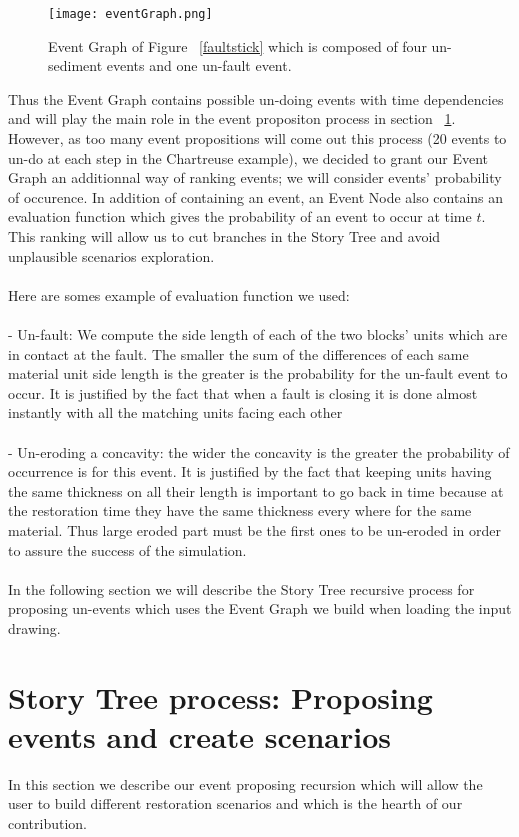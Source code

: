\documentclass[12pt, a4paper]{report} %
\begin{document}
	\begin{figure}[H]
	\centering
	\texttt{[image: eventGraph.png]}
	\caption{ Event Graph of Figure ~\ref{faultstick} which is composed of four un-sediment events and one un-fault event.}
	\label{eventGraph}
	\end{figure}

Thus the Event Graph contains possible un-doing events with time dependencies and will play the main role in the event propositon process in section ~\ref{sec:storytree}. However, as too many event propositions will come out this process (20 events to un-do at each step in the Chartreuse example), we decided to grant our Event Graph an additionnal way of ranking events; we will consider events' probability of occurence. In addition of containing an event, an Event Node also contains an evaluation function which gives the probability of an event to occur at time $t$. This ranking will allow us to cut branches in the Story Tree and avoid unplausible scenarios exploration.
\\\\
Here are somes example of evaluation function we used:
\\\\
 - Un-fault: We compute the side length of each of the two blocks' units which are in contact at the fault. The smaller the sum of the differences of each same material unit side length is the greater is the probability for the un-fault event to occur. It is justified by the fact that when a fault is closing it is done almost instantly with all the matching units facing each other\\\\
 
 - Un-eroding a concavity: the wider the concavity is the greater the probability of occurrence is for this event. It is justified by the fact that keeping units having the same thickness on all their length is important to go back in time because at the restoration time they have the same thickness every where for the same material. Thus large eroded part must be the first ones to be un-eroded in order to assure the success of the simulation.\\\\

In the following section we will describe the Story Tree recursive process for proposing un-events which uses the Event Graph we build when loading the input drawing.

\section{Story Tree process: Proposing events and create scenarios} 
\label{sec:storytree}
In this section we describe our event proposing recursion which will allow the user to build different restoration scenarios and which is the hearth of our contribution.\\\\
\end{document}
